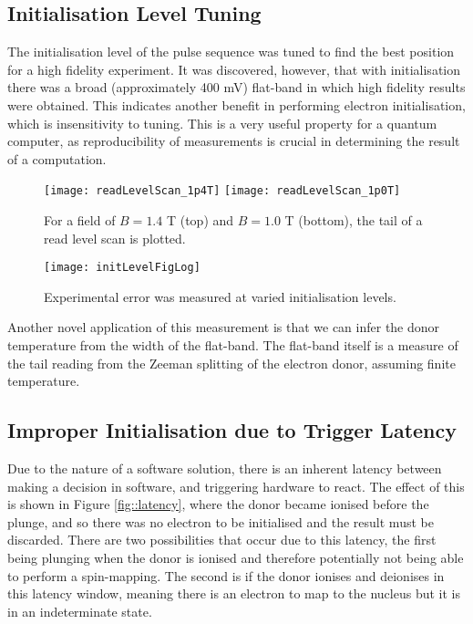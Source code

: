 \subsection{Initialisation Level Tuning}
	The initialisation level of the pulse sequence was tuned to find the best position for a high fidelity experiment. It was discovered, however, that with initialisation there was a broad (approximately 400 mV) flat-band in which high fidelity results were obtained. This indicates another benefit in performing electron initialisation, which is insensitivity to tuning. This is a very useful property for a quantum computer, as reproducibility of measurements is crucial in determining the result of a computation.
%	
	\begin{figure}[htbp!]
		\flushleft
		\texttt{[image: readLevelScan\_1p4T]}
		\texttt{[image: readLevelScan\_1p0T]}
		\caption{For a field of $B = 1.4$ T (top) and $B = 1.0$ T (bottom), the tail of a read level scan is plotted.}
		\label{fig::readLevel}
	\end{figure}
	
	\begin{figure}[htbp!]
		\centering
		\texttt{[image: initLevelFigLog]}
		\caption{Experimental error was measured at varied initialisation levels.}
		\label{fig::initLevel}
	\end{figure}
	
	Another novel application of this measurement is that we can infer the donor temperature from the width of the flat-band. The flat-band itself is a measure of the tail reading from the Zeeman splitting of the electron donor, assuming finite temperature.

\subsection{Improper Initialisation due to Trigger Latency}
	Due to the nature of a software solution, there is an inherent latency between making a decision in software, and triggering hardware to react. The effect of this is shown in Figure \ref{fig::latency}, where the donor became ionised before the plunge, and so there was no electron to be initialised and the result must be discarded. There are two possibilities that occur due to this latency, the first being plunging when the donor is ionised and therefore potentially not being able to perform a spin-mapping. The second is if the donor ionises and deionises in this latency window, meaning there is an electron to map to the nucleus but it is in an indeterminate state.
	
